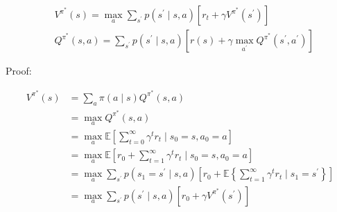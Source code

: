 \documentclass[11pt]{article}
\begin{document}
\begin{equation}
\begin{aligned}
&V^{\pi^{*}}(s)=\max _{a} \sum_{s^{\prime}} p\left(s^{\prime} \mid s, a\right)\left[r_{t}+\gamma V^{\pi^{*}}\left(s^{\prime}\right)\right] \\
&Q^{\pi^{*}}(s, a)=\sum_{s^{\prime}} p\left(s^{\prime} \mid s, a\right)\left[r(s)+\gamma \max _{a^{\prime}} Q^{\pi^{*}}\left(s^{\prime}, a^{\prime}\right)\right]
\end{aligned}
\end{equation}


Proof: 

\begin{align*}
V^{\pi^{*}}(s) &=\sum_{a} \pi(a \mid s) Q^{\pi^{*}}(s, a) \\
&=\max _{a} Q^{\pi^{*}}(s, a) \\
&=\max _{a} \mathbb{E}\left[\sum_{t=0}^{\infty} \gamma^{t} r_{t} \mid s_{0}=s, a_{0}=a\right] \\
&=\max _{a} \mathbb{E}\left[r_{0}+\sum_{t=1}^{\infty} \gamma^{t} r_{t} \mid s_{0}=s, a_{0}=a\right] \\
&=\max _{a} \sum_{s^{\prime}} p\left(s_{1}=s^{\prime} \mid s, a\right)\left[r_{0}+\mathbb{E}\left\{\sum_{t=1}^{\infty} \gamma^{t} r_{t} \mid s_{1}=s^{\prime}\right\}\right] \\
&= \max _{a} \sum_{s^{\prime}} p\left(s^{\prime} \mid s, a\right)\left[r_{0}+\gamma V^{\pi^{*}}\left(s^{\prime}\right)\right] \\
\end{align*}





























{


}
\end{document}
